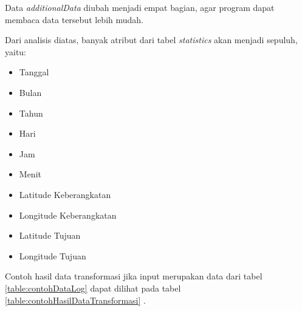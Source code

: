 Data \textsl{additionalData} diubah menjadi empat bagian, agar program dapat membaca data tersebut lebih mudah.

Dari analisis diatas, banyak atribut dari tabel \textsl{statistics} akan menjadi sepuluh, yaitu:
\begin{itemize}
	\item Tanggal
	\item Bulan
	\item Tahun
	\item Hari
	\item Jam
	\item Menit
	\item Latitude Keberangkatan
	\item Longitude Keberangkatan
	\item Latitude Tujuan
	\item Longitude Tujuan
\end{itemize}

Contoh hasil data transformasi jika input merupakan data dari tabel \ref{table:contohDataLog} dapat dilihat pada tabel \ref{table:contohHasilDataTransformasi}	.

